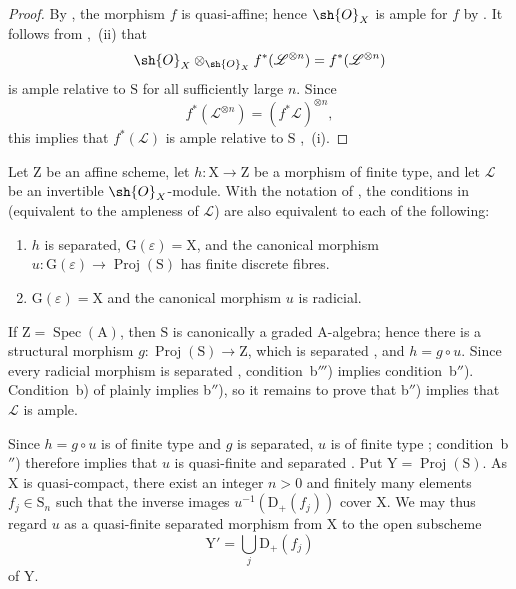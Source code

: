 \begin{proof}
By , the morphism $f$ is quasi-affine; hence $\sh{O}_X$ is ample for $f$ by . It follows from ,~(ii) that
\[
  \sh{O}_X\otimes_{\sh{O}_X}f^*(\mathscr{L}^{\otimes n})
  =f^*(\mathscr{L}^{\otimes n})
\]
is ample relative to $\mathrm{S}$ for all sufficiently large $n$. Since
\[
  f^*(\mathscr{L}^{\otimes n})=(f^*\mathscr{L})^{\otimes n},
\]
this implies that $f^*(\mathscr{L})$ is ample relative to $\mathrm{S}$ ,~(i).
\end{proof}

\begin{corollary}[18.12.17]
\label{IV.18.12.17}
Let $\mathrm{Z}$ be an affine scheme, let $h:\mathrm{X}\to\mathrm{Z}$ be a morphism of finite type, and let $\mathscr{L}$ be an invertible $\sh{O}_X$-module.
With the notation of , the conditions in  (equivalent to the ampleness of $\mathscr{L}$) are also equivalent to each of the following:

\begin{enumerate}
  \item[\rm b$''$)] $h$ is separated, $\mathrm{G}(\varepsilon)=\mathrm{X}$, and the canonical morphism $u:\mathrm{G}(\varepsilon)\to\operatorname{Proj}(\mathrm{S})$ has finite discrete fibres.
  \item[\rm b$'''$)] $\mathrm{G}(\varepsilon)=\mathrm{X}$ and the canonical morphism $u$ is radicial.
\end{enumerate}

If $\mathrm{Z}=\operatorname{Spec}(\mathrm{A})$, then $\mathrm{S}$ is canonically a graded $\mathrm{A}$-algebra; hence there is a structural morphism $g:\operatorname{Proj}(\mathrm{S})\to\mathrm{Z}$, which is separated , and $h=g\circ u$. Since every radicial morphism is separated , condition~b$'''$) implies condition~b$''$). Condition~b) of  plainly implies b$''$), so it remains to prove that b$''$) implies that $\mathscr{L}$ is ample.

Since $h=g\circ u$ is of finite type and $g$ is separated, $u$ is of finite type ; condition~b$''$) therefore implies that $u$ is quasi-finite and separated . Put $\mathrm{Y}=\operatorname{Proj}(\mathrm{S})$. As $\mathrm{X}$ is quasi-compact, there exist an integer $n>0$ and finitely many elements $f_j\in\mathrm{S}_n$ such that the inverse images $u^{-1}(\mathrm{D}_+(f_j))$ cover $\mathrm{X}$. We may thus regard $u$ as a quasi-finite separated morphism from $\mathrm{X}$ to the open subscheme
\[
  \mathrm{Y}'=\bigcup_j\mathrm{D}_+(f_j)
\]
of $\mathrm{Y}$.


\end{corollary}
